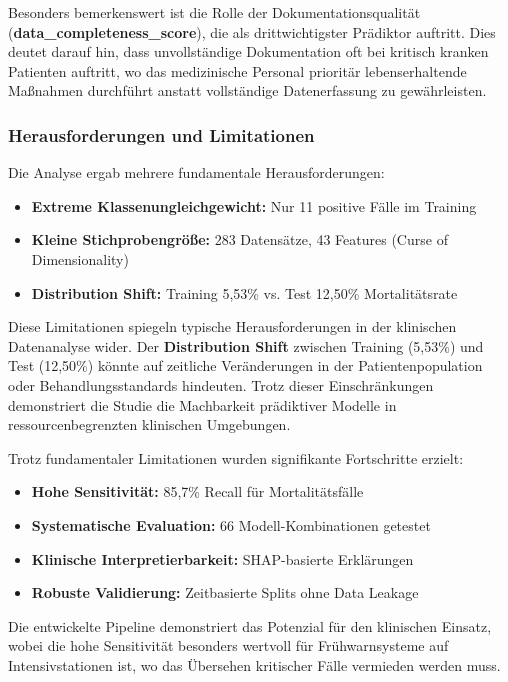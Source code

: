 \documentclass[12pt]{article}
\begin{document}
Besonders bemerkenswert ist die Rolle der Dokumentationsqualität (\textbf{data\_completeness\_score}), die als drittwichtigster Prädiktor auftritt. Dies deutet darauf hin, dass unvollständige Dokumentation oft bei kritisch kranken Patienten auftritt, wo das medizinische Personal prioritär lebenserhaltende Maßnahmen durchführt anstatt vollständige Datenerfassung zu gewährleisten.



\subsubsection{Herausforderungen und Limitationen}

Die Analyse ergab mehrere fundamentale Herausforderungen:
\begin{itemize}
    \item \textbf{Extreme Klassenungleichgewicht:} Nur 11 positive Fälle im Training
    \item \textbf{Kleine Stichprobengröße:} 283 Datensätze, 43 Features (Curse of Dimensionality)
    \item \textbf{Distribution Shift:} Training 5,53\% vs. Test 12,50\% Mortalitätsrate
\end{itemize}

Diese Limitationen spiegeln typische Herausforderungen in der klinischen Datenanalyse wider. Der \textbf{Distribution Shift} zwischen Training (5,53\%) und Test (12,50\%) könnte auf zeitliche Veränderungen in der Patientenpopulation oder Behandlungsstandards hindeuten. Trotz dieser Einschränkungen demonstriert die Studie die Machbarkeit prädiktiver Modelle in ressourcenbegrenzten klinischen Umgebungen.

Trotz fundamentaler Limitationen wurden signifikante Fortschritte erzielt:
\begin{itemize}
    \item \textbf{Hohe Sensitivität:} 85,7\% Recall für Mortalitätsfälle
    \item \textbf{Systematische Evaluation:} 66 Modell-Kombinationen getestet
    \item \textbf{Klinische Interpretierbarkeit:} SHAP-basierte Erklärungen
    \item \textbf{Robuste Validierung:} Zeitbasierte Splits ohne Data Leakage
\end{itemize}

Die entwickelte Pipeline demonstriert das Potenzial für den klinischen Einsatz, wobei die hohe Sensitivität besonders wertvoll für Frühwarnsysteme auf Intensivstationen ist, wo das Übersehen kritischer Fälle vermieden werden muss.
\end{document}
